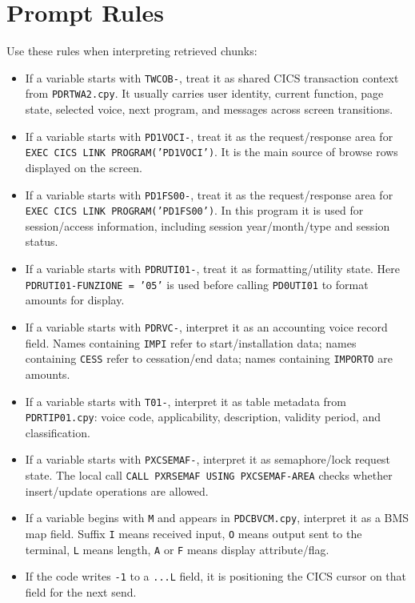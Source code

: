 \documentclass[11pt,a4paper]{article}
\begin{document}
\section*{Prompt Rules}

Use these rules when interpreting retrieved chunks:

\begin{itemize}
  \item If a variable starts with \texttt{TWCOB-}, treat it as shared CICS transaction context from \texttt{PDRTWA2.cpy}. It usually carries user identity, current function, page state, selected voice, next program, and messages across screen transitions.
  \item If a variable starts with \texttt{PD1VOCI-}, treat it as the request/response area for \texttt{EXEC CICS LINK PROGRAM('PD1VOCI')}. It is the main source of browse rows displayed on the screen.
  \item If a variable starts with \texttt{PD1FS00-}, treat it as the request/response area for \texttt{EXEC CICS LINK PROGRAM('PD1FS00')}. In this program it is used for session/access information, including session year/month/type and session status.
  \item If a variable starts with \texttt{PDRUTI01-}, treat it as formatting/utility state. Here \texttt{PDRUTI01-FUNZIONE = '05'} is used before calling \texttt{PD0UTI01} to format amounts for display.
  \item If a variable starts with \texttt{PDRVC-}, interpret it as an accounting voice record field. Names containing \texttt{IMPI} refer to start/installation data; names containing \texttt{CESS} refer to cessation/end data; names containing \texttt{IMPORTO} are amounts.
  \item If a variable starts with \texttt{T01-}, interpret it as table metadata from \texttt{PDRTIP01.cpy}: voice code, applicability, description, validity period, and classification.
  \item If a variable starts with \texttt{PXCSEMAF-}, interpret it as semaphore/lock request state. The local call \texttt{CALL PXRSEMAF USING PXCSEMAF-AREA} checks whether insert/update operations are allowed.
  \item If a variable begins with \texttt{M} and appears in \texttt{PDCBVCM.cpy}, interpret it as a BMS map field. Suffix \texttt{I} means received input, \texttt{O} means output sent to the terminal, \texttt{L} means length, \texttt{A} or \texttt{F} means display attribute/flag.
  \item If the code writes \texttt{-1} to a \texttt{...L} field, it is positioning the CICS cursor on that field for the next send.

\end{itemize}
\end{document}
